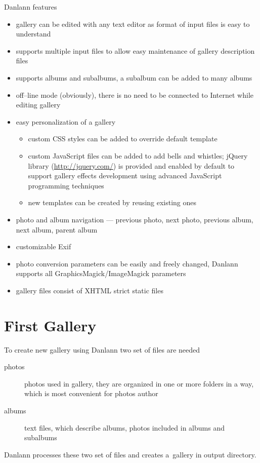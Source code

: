 \documentclass{article}
\begin{document}
Danlann features
\begin{itemize}
\itemsep0pt
\item gallery can be edited with any text editor as format of input files
    is easy to understand
\item supports multiple input files to allow easy maintenance of gallery
    description files
\item supports albums and subalbums, a subalbum can be added to many albums
\item off--line mode (obviously), there is no need to be connected to Internet while
    editing gallery
\item easy personalization of a gallery
    \begin{itemize}
    \itemsep0pt
    \item custom CSS styles can be added to override default template
    \item custom JavaScript files can be added to add bells and whistles;
        jQuery library (\url{http://jquery.com/}) is provided and enabled by
        default to support gallery effects development using advanced JavaScript
        programming techniques
    \item new templates can be created by reusing existing ones
    \end{itemize}
\item photo and album navigation --- previous photo, next photo, previous
    album, next album, parent album
\item customizable Exif
\item photo conversion parameters can be easily and freely changed,
    Danlann supports all GraphicsMagick/ImageMagick parameters
\item gallery files consist of XHTML strict static files
\end{itemize}

\section{First Gallery}\label{example}
To create new gallery using Danlann two set of files are needed
\begin{description}
\item[photos] photos used in gallery, they are organized in one or more
folders in a way, which is most convenient for photos author
\item[albums] text files, which describe albums, photos included in albums
    and subalbums
\end{description}
Danlann processes these two set of files and creates a~gallery in output
directory.
\end{document}
